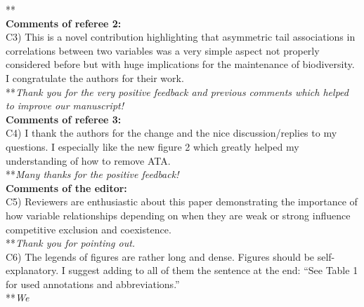 \documentclass[letterpaper,11pt]{article}
\begin{document}
\noindent ***\emph{} \\

\noindent \textbf{Comments of referee 2:} \\

\noindent C3) This is a novel contribution highlighting that asymmetric tail associations in correlations between two variables was a very simple aspect not properly considered before but with huge implications for the maintenance of biodiversity. I congratulate the authors for their work. \\

\noindent ***\emph{Thank you for the very positive feedback and previous comments which helped to improve our manuscript!} \\

\noindent \textbf{Comments of referee 3:} \\

\noindent C4) I thank the authors for the change and the nice discussion/replies to my questions. I especially like the new figure 2 which greatly helped my understanding of how to remove ATA. \\
  
\noindent ***\emph{Many thanks for the positive feedback!} \\

\noindent \textbf{Comments of the editor:} \\

\noindent C5) Reviewers are enthusiastic about this paper demonstrating the importance of how variable relationships depending on when they are weak or strong influence competitive exclusion and coexistence. \\

\noindent ***\emph{Thank you for pointing out.} \\

\noindent C6) The legends of figures are rather long and dense. Figures should be self-explanatory. I suggest adding to all of them the sentence at the end: “See Table 1 for used annotations and abbreviations.” \\

\noindent ***\emph{We }
\end{document}
